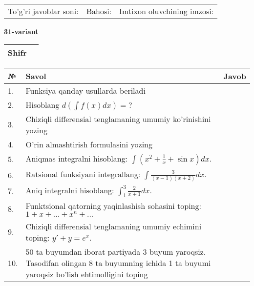 \documentclass{article}
\begin{document}
  \vspace{1cm}
  
  \begin{tabular}{lll}
  To'g'ri javoblar soni: \underline{\hspace{1.5cm}} & 
  Bahosi: \underline{\hspace{1.5cm}} & 
  Imtixon oluvchining imzosi: \underline{\hspace{2cm}} \\
  \end{tabular}
  
  \egroup
  
  \newpage
  
  
  \textbf{31-variant}\\
  
  \bgroup
  \def\arraystretch{1.6} %
  
  \begin{tabular}{|m{5.7cm}|m{9.5cm}|}
  \hline
  Shifr & \\
  \hline
  \end{tabular}
  
  \vspace{1cm}
  
  \begin{tabular}{|m{0.7cm}|m{10cm}|m{4cm}|}
  \hline
  № & Savol & Javob \\
  \hline
  1. & Funksiya qanday usullarda beriladi &  \\
  \hline
  2. & Hisoblang \(d\left( \int {f(x)dx} \right) = ?\) &  \\
  \hline
  3. & Chiziqli differensial tenglamaning umumiy ko'rinishini yozing &  \\
  \hline
  4. & O'rin almashtirish formulasini yozing &  \\
  \hline
  5. & Aniqmas integralni hisoblang: \(\int {\left( x^{2} + \frac{1}{x} + \sin x \right)dx}\). &  \\
  \hline
  6. & Ratsional funksiyani integrallang: \(\int {\frac{3}{(x - 1)(x + 2)}dx}\). &  \\
  \hline
  7. & Aniq integralni hisoblang: \(\int_{1}^{3}\frac{2}{x + 1}dx\). &  \\
  \hline
  8. & Funktsional qatorning yaqinlashish sohasini toping:\(1 + x + ... + x^{n} + ...\) &  \\
  \hline
  9. & Chiziqli differensial tenglamaning umumiy echimini toping: \(y' + y = e^{x}\). &  \\
  \hline
  10. & 50 ta buyumdan iborat partiyada 3 buyum yaroqsiz. Tasodifan olingan 8 ta buyumning ichida 1 ta buyumi yaroqsiz bo'lish ehtimolligini toping &  \\
  \hline
  \end{tabular}
  
\end{document}
